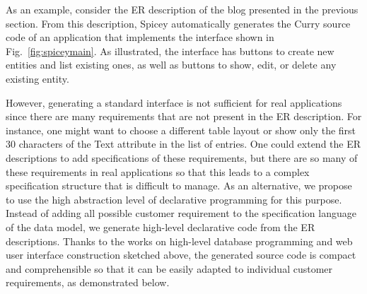 \documentclass{tlp}
\renewcommand{\tt}{\usefont{OT1}{cmtt}{m}{n}\selectfont}
\newcommand{\code}[1]{\mbox{\tt #1}}   \newcommand{\ccode}[1]{``\mbox{\tt #1}''}  \newcommand{\bs}{\char92} \newcommand{\us}{\char95}
\begin{document}
As an example, consider the ER description of the blog
presented in the previous section.
{}From this description, Spicey automatically generates
the Curry source code of an application that implements
the interface shown in Fig.~\ref{fig:spiceymain}.
As illustrated, the interface has buttons to create
new entities and list existing ones, as well as buttons
to show, edit, or delete any existing entity.

However, generating a standard interface is not sufficient
for real applications since there are many requirements
that are not present in the ER description.
For instance, one might want to choose a different table layout
or show only the first 30 characters of the \code{Text}
attribute in the list of entries.
One could extend the ER descriptions to add specifications
of these requirements, but there are so many of these
requirements in real applications so that this leads to
a complex specification structure that is difficult to manage.
As an alternative, we propose to use the high abstraction level
of declarative programming for this purpose.
Instead of adding all possible customer requirement
to the specification language of the data model,
we generate high-level declarative code from the ER descriptions.
Thanks to the works on high-level database programming
and web user interface construction sketched above,
the generated source code is compact and comprehensible
so that it can be easily adapted to individual customer requirements,
as demonstrated below.
\end{document}

